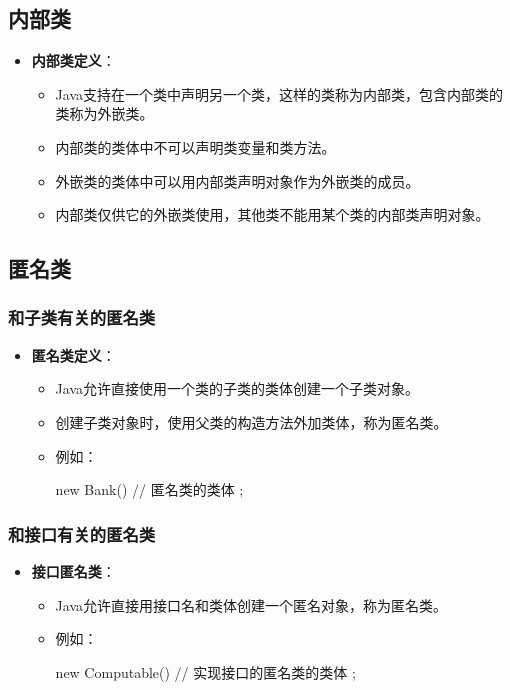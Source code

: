 \documentclass[a4paper, 10pt]{ctexart}
\begin{document}
\subsection{内部类}
\begin{itemize}
  \item \textbf{内部类定义}：
  \begin{itemize}
    \item Java支持在一个类中声明另一个类，这样的类称为内部类，包含内部类的类称为外嵌类。
    \item 内部类的类体中不可以声明类变量和类方法。
    \item 外嵌类的类体中可以用内部类声明对象作为外嵌类的成员。
    \item 内部类仅供它的外嵌类使用，其他类不能用某个类的内部类声明对象。
  \end{itemize}
\end{itemize}

\subsection{匿名类}
\subsubsection{和子类有关的匿名类}
\begin{itemize}
  \item \textbf{匿名类定义}：
  \begin{itemize}
    \item Java允许直接使用一个类的子类的类体创建一个子类对象。
    \item 创建子类对象时，使用父类的构造方法外加类体，称为匿名类。
    \item 例如：
    \begin{codeblock}
new Bank() {
    // 匿名类的类体
};
    \end{codeblock}
  \end{itemize}
\end{itemize}

\subsubsection{和接口有关的匿名类}
\begin{itemize}
  \item \textbf{接口匿名类}：
  \begin{itemize}
    \item Java允许直接用接口名和类体创建一个匿名对象，称为匿名类。
    \item 例如：
    \begin{codeblock}
new Computable() {
    // 实现接口的匿名类的类体
};
    \end{codeblock}
  \end{itemize}
\end{itemize}
\end{document}
